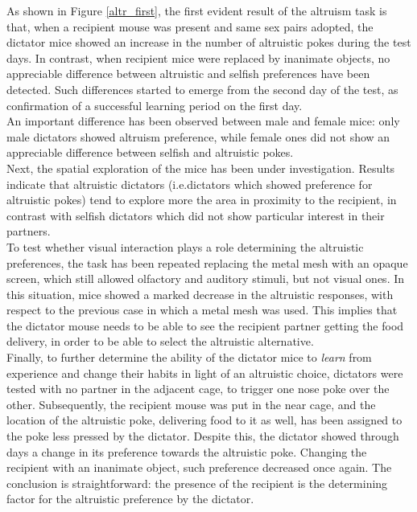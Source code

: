 \documentclass[12pt, a4paper]{report}
\begin{document}
As shown in Figure \ref{altr_first}, the first evident result of the altruism task is that, when a recipient mouse was present and same sex pairs adopted, the dictator mice showed an increase in the number of altruistic pokes during the test days. In contrast, when recipient mice were replaced by inanimate objects, no appreciable difference between altruistic and selfish preferences have been detected. Such differences started to emerge from the second day of the test, as confirmation of a successful learning period on the first day. \\
An important difference has been observed between male and female mice:  only male dictators showed altruism preference, while female ones did not show an appreciable difference between selfish and altruistic pokes.\\
Next, the spatial exploration of the mice has been under investigation. Results indicate that altruistic dictators (i.e.dictators which showed preference for altruistic pokes) tend to explore more the area in proximity to the recipient, in contrast with selfish dictators which did not show particular interest in their partners.\\
To test whether visual interaction plays a role determining the altruistic preferences, the task has been repeated replacing the metal mesh with an opaque screen, which still allowed olfactory and auditory stimuli, but not visual ones. In this situation, mice showed a marked decrease in the altruistic responses, with respect to the previous case in which a metal mesh was used. This implies that the dictator mouse needs to be able to see the recipient partner getting the food delivery, in order to be able to select the altruistic alternative.\\
Finally, to further determine the ability of the dictator mice to \textit{learn} from experience and change their habits in light of an altruistic choice, dictators were tested with no partner in the adjacent cage, to trigger one nose poke over the other. Subsequently, the recipient mouse was put in the near cage, and the location of the altruistic poke, delivering food to it as well, has been assigned to the poke less pressed by the dictator. Despite this, the dictator showed through days a change in its preference towards the altruistic poke. Changing the recipient with an inanimate object, such preference decreased once again. The conclusion is straightforward: the presence of the recipient is the determining factor for the altruistic preference by the dictator.
\\
\end{document}
